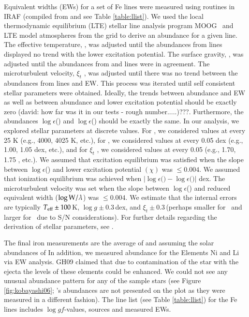 Equivalent widths (EWs) for a set of Fe lines were measured using routines in IRAF (compiled from \citet[][henceforth Reddy03]{2003MNRAS.340..304R} and \citet[][henceforth RC02]{2002AJ....123.3277R} see Table \ref{table:llist}). We used the local thermodynamic equilibrium (LTE) stellar line analysis program MOOG \citemoog\ and LTE model atmospheres from the \citet{2003IAUS..210P.A20C} grid to derive an abundance for a given line. The effective temperature, \teff, was adjusted until the abundances from  lines displayed no trend with the lower excitation potential. The surface gravity, \logg, was adjusted until the abundances from  and  lines were in agreement. The microturbulent velocity, $\xi _{t}$ , was adjusted until there was no trend between the abundances from  lines and EW. This process was iterated until self consistent stellar parameters were obtained. Ideally, the trends between abundance and EW as well as between abundance and lower excitation potential should be exactly zero (david: how far was it in our tests - rough number.....)???. Furthermore, the abundances $\log{\epsilon}$() and $\log{\epsilon}$()  should be exactly the same. In our analysis, we explored stellar parameters at discrete values. For \teff, we considered values at every 25 K (e.g., 4000, 4025 K, etc.), for \logg , we considered values at every 0.05 dex (e.g., 1.00, 1.05 dex, etc.), and for $\xi _{t}$ , we considered values at every 0.05 \kms (e.g., 1.70, 1.75 \kms, etc.). We assumed that excitation equilibrium was satisfied when the slope between $\log{\epsilon}$() and lower excitation potential $(\chi)$ was $\leq0.004$. We assumed that ionization equilibrium was achieved when $\vert\log{\epsilon} ($$) - \log{\epsilon} ($$)\vert$ dex. The microturbulent velocity was set when the slope between $\log{\epsilon}$() and reduced equivalent width ($\log{\rm{W}}/\lambda$) was $\leq0.004$. We estimate that the internal errors are typically $T_{\rm{eff}}\pm100$\,K, $\log{g}\pm0.3$\,dex, and $\xi _{t}\pm0.3$\,\kms (perhaps smaller for \stara\ and larger for \starc\ due to S/N considerations). 
For further details regarding the derivation of stellar parameters, see \citet{2008ApJ...673..854Y}.

The final iron measurements are the average of  and  assuming the solar abundances of \citet{2009ARA&A..47..481A} 
In addition, we measured abundance for the Elements Ni and Li via EW analysis. GH09 claimed that due to contamination of the star with the ejecta the levels of these elements could be enhanced. We could not see any unusual abundance pattern for any of the sample stars (see Figure \ref{fig:kobayashi06}; \starb's abundances are not presented on the plot as they were measured in a different fashion).  The line list (see Table \ref{table:llist}) for the Fe lines includes $\log{gf}$-values, sources and measured EWs.


